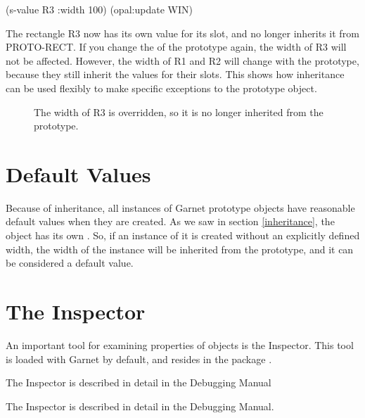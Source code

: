 \begin{programexample}
(s-value R3 :width 100)
(opal:update WIN)
\end{programexample}

The rectangle R3 now has its own value for its  slot, and
no longer inherits it from PROTO-RECT.  If you change the 
of the prototype again, the width of R3 will not be affected.
However, the width of R1 and R2 will change with the prototype,
because they still inherit the values for their  slots.
This shows how inheritance can be used flexibly to make specific
exceptions to the prototype object.

\begin{figure}
\begin{center}
\begin{makeimage}
\end{makeimage}
\begin{latexonly}
\end{latexonly}
\end{center}
\caption{The width of R3 is overridden, so it is no longer inherited
from the prototype.}
\end{figure}


\section{Default Values}

Because of inheritance, all instances of Garnet prototype objects have
reasonable default values when they are created.  As we saw in section
\ref{inheritance}, the
 object has its own .  So, if an
instance of it is created without an explicitly defined width, the
width of the instance will be inherited from the
prototype, and it can be considered a default value.


\section{The Inspector}
\label{inspector-sec}

An important tool for examining properties of objects is the Inspector.
This tool is loaded with Garnet by default, and resides in the package
.  
\begin{latexonly}
The Inspector is described in detail in the Debugging
Manual
\end{latexonly}
\begin{htmlonly}
The Inspector is described in detail in the Debugging
Manual.
\end{htmlonly}

